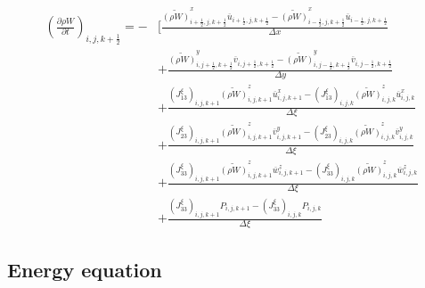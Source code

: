 \begin{align}
 \left(\frac{\partial \rho W}{\partial t}\right)_{i,j,k+\frac{1}{2}}
 = - &\Bigg[ \frac{ \widetilde{(\rho W)}^x_{i+\frac{1}{2},j,k+\frac{1}{2}} \overline{u}_{i+\frac{1}{2},j,k+\frac{1}{2}}
                  - \widetilde{(\rho W)}^x_{i-\frac{1}{2},j,k+\frac{1}{2}} \overline{u}_{i-\frac{1}{2},j,k+\frac{1}{2}}
                  } {\Delta x} \nonumber \\
          &+ \frac{ \widetilde{(\rho W)}^y_{i,j+\frac{1}{2},k+\frac{1}{2}} \overline{v}_{i,j+\frac{1}{2},k+\frac{1}{2}}
                  - \widetilde{(\rho W)}^y_{i,j-\frac{1}{2},k+\frac{1}{2}} \overline{v}_{i,j-\frac{1}{2},k+\frac{1}{2}}
                  } {\Delta y} \nonumber \\
          &+ \frac{ (J^{\xi}_{13})_{i,j,k+1} \widetilde{(\rho W)}^z_{i,j,k+1} \overline{u}^x_{i,j,k+1}
                  - (J^{\xi}_{13})_{i,j,k  } \widetilde{(\rho W)}^z_{i,j,k  } \overline{u}^x_{i,j,k  }
                  } {\Delta \xi} \nonumber \\
          &+ \frac{ (J^{\xi}_{23})_{i,j,k+1} \widetilde{(\rho W)}^z_{i,j,k+1} \overline{v}^y_{i,j,k+1}
                  - (J^{\xi}_{23})_{i,j,k  } \widetilde{(\rho W)}^z_{i,j,k  } \overline{v}^y_{i,j,k  }
                  } {\Delta \xi} \nonumber \\
          &+ \frac{ (J^{\xi}_{33})_{i,j,k+1} \widetilde{(\rho W)}^z_{i,j,k+1} \overline{w}^z_{i,j,k+1}
                  - (J^{\xi}_{33})_{i,j,k  } \widetilde{(\rho W)}^z_{i,j,k  } \overline{w}^z_{i,j,k  }
                  } {\Delta \xi} \nonumber \\
          &+ \frac{ (J^{\xi}_{33})_{i,j,k+1} P_{i,j,k+1}
                  - (J^{\xi}_{33})_{i,j,k  } P_{i,j,k  }
                  } {\Delta \xi}
\end{align}

\subsection{Energy equation}

